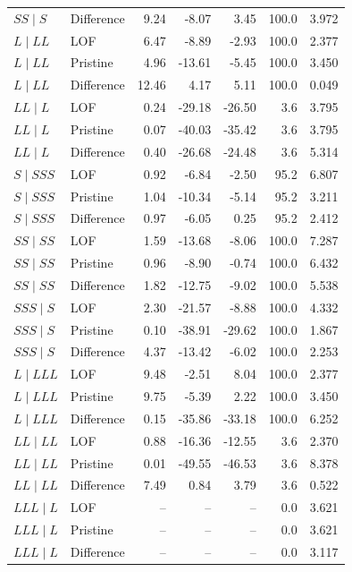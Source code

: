 {\begin{longtable}{@{}llrrrrr@{}}
$SS\mid S$ & Difference & 9.24 & -8.07 & 3.45 & 100.0 & 3.972 \\
\addlinespace
$L\mid LL$ & LOF & 6.47 & -8.89 & -2.93 & 100.0 & 2.377 \\
$L\mid LL$ & Pristine & 4.96 & -13.61 & -5.45 & 100.0 & 3.450 \\
$L\mid LL$ & Difference & 12.46 & 4.17 & 5.11 & 100.0 & 0.049 \\
\addlinespace
$LL\mid L$ & LOF & 0.24 & -29.18 & -26.50 & 3.6 & 3.795 \\
$LL\mid L$ & Pristine & 0.07 & -40.03 & -35.42 & 3.6 & 3.795 \\
$LL\mid L$ & Difference & 0.40 & -26.68 & -24.48 & 3.6 & 5.314 \\
\addlinespace
$S\mid SSS$ & LOF & 0.92 & -6.84 & -2.50 & 95.2 & 6.807 \\
$S\mid SSS$ & Pristine & 1.04 & -10.34 & -5.14 & 95.2 & 3.211 \\
$S\mid SSS$ & Difference & 0.97 & -6.05 & 0.25 & 95.2 & 2.412 \\
\addlinespace
$SS\mid SS$ & LOF & 1.59 & -13.68 & -8.06 & 100.0 & 7.287 \\
$SS\mid SS$ & Pristine & 0.96 & -8.90 & -0.74 & 100.0 & 6.432 \\
$SS\mid SS$ & Difference & 1.82 & -12.75 & -9.02 & 100.0 & 5.538 \\
\addlinespace
$SSS\mid S$ & LOF & 2.30 & -21.57 & -8.88 & 100.0 & 4.332 \\
$SSS\mid S$ & Pristine & 0.10 & -38.91 & -29.62 & 100.0 & 1.867 \\
$SSS\mid S$ & Difference & 4.37 & -13.42 & -6.02 & 100.0 & 2.253 \\
\addlinespace
$L\mid LLL$ & LOF & 9.48 & -2.51 & 8.04 & 100.0 & 2.377 \\
$L\mid LLL$ & Pristine & 9.75 & -5.39 & 2.22 & 100.0 & 3.450 \\
$L\mid LLL$ & Difference & 0.15 & -35.86 & -33.18 & 100.0 & 6.252 \\
\addlinespace
$LL\mid LL$ & LOF & 0.88 & -16.36 & -12.55 & 3.6 & 2.370 \\
$LL\mid LL$ & Pristine & 0.01 & -49.55 & -46.53 & 3.6 & 8.378 \\
$LL\mid LL$ & Difference & 7.49 & 0.84 & 3.79 & 3.6 & 0.522 \\
\addlinespace
$LLL\mid L$ & LOF & -- & -- & -- & 0.0 & 3.621 \\
$LLL\mid L$ & Pristine & -- & -- & -- & 0.0 & 3.621 \\
$LLL\mid L$ & Difference & -- & -- & -- & 0.0 & 3.117 \\

\end{longtable}}
